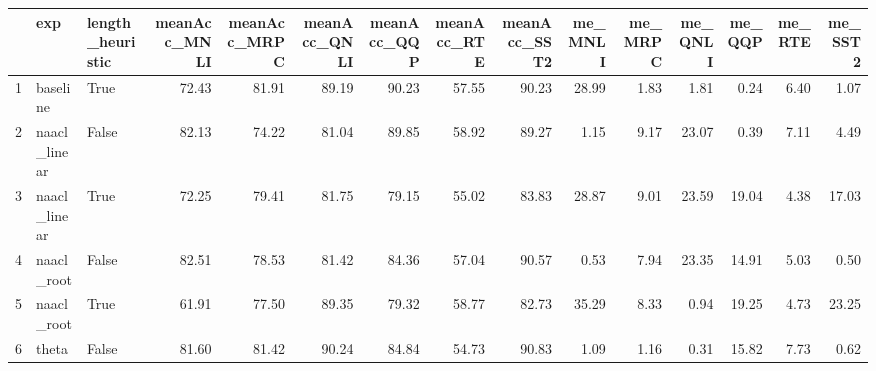 \begin{table}[ht]
\centering
\begin{tabular}{rllrrrrrrrrrrrr}
  \hline
 & exp & length\_heuristic & meanAcc\_MNLI & meanAcc\_MRPC & meanAcc\_QNLI & meanAcc\_QQP & meanAcc\_RTE & meanAcc\_SST2 & me\_MNLI & me\_MRPC & me\_QNLI & me\_QQP & me\_RTE & me\_SST2 \\ 
  \hline
1 & baseline & True & 72.43 & 81.91 & 89.19 & 90.23 & 57.55 & 90.23 & 28.99 & 1.83 & 1.81 & 0.24 & 6.40 & 1.07 \\ 
  2 & naacl\_linear & False & 82.13 & 74.22 & 81.04 & 89.85 & 58.92 & 89.27 & 1.15 & 9.17 & 23.07 & 0.39 & 7.11 & 4.49 \\ 
  3 & naacl\_linear & True & 72.25 & 79.41 & 81.75 & 79.15 & 55.02 & 83.83 & 28.87 & 9.01 & 23.59 & 19.04 & 4.38 & 17.03 \\ 
  4 & naacl\_root & False & 82.51 & 78.53 & 81.42 & 84.36 & 57.04 & 90.57 & 0.53 & 7.94 & 23.35 & 14.91 & 5.03 & 0.50 \\ 
  5 & naacl\_root & True & 61.91 & 77.50 & 89.35 & 79.32 & 58.77 & 82.73 & 35.29 & 8.33 & 0.94 & 19.25 & 4.73 & 23.25 \\ 
  6 & theta & False & 81.60 & 81.42 & 90.24 & 84.84 & 54.73 & 90.83 & 1.09 & 1.16 & 0.31 & 15.82 & 7.73 & 0.62 \\ 
   \hline
\end{tabular}
\end{table}
